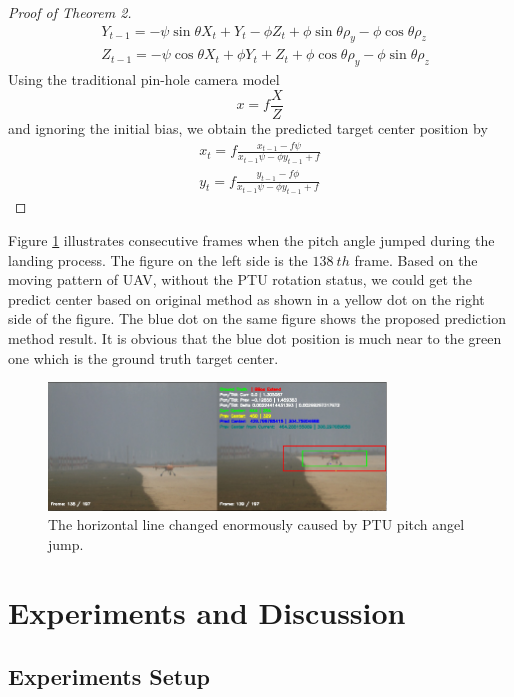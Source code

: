 \documentclass[journal,article,submit,moreauthors,pdftex,10pt,a4paper]{mdpi}
\begin{document}
\begin{proof}[Proof of Theorem 2]
\begin{align}
&Y_{t-1} = -\psi \sin \theta X_t +  Y_ t - \phi Z_t + \phi \sin \theta \rho_y - \phi \cos \theta \rho_z \\
&Z_{t-1}  = -\psi \cos \theta X_t + \phi  Y_ t + Z_t + \phi \cos \theta \rho_y - \phi \sin \theta \rho_z
\end{align}
Using the traditional pin-hole camera model
\begin{equation}
x = f \frac{X}{Z}
\end{equation}
and ignoring the initial bias, we obtain the predicted target center position by
\begin{align}
\label{eq:prev_predict_curr}
x_{t} = f\frac{x_{t-1} - f\psi }{x_{t-1}  \psi  - \phi y_{t-1} + f} \\
y_{t} = f\frac{y_{t-1} -f\phi}{  x_{t-1} \psi - \phi y_{t-1} + f}
\end{align}
\end{proof}

Figure \ref{fig:chp04_17_predict_1} illustrates consecutive frames when the pitch angle jumped during the landing process. The figure on the left side is the $138\ th$ frame. Based on the moving pattern of UAV, without the PTU rotation status, we could get the predict center based on original method as shown in a yellow dot on the right side of the figure. The blue dot on the same figure shows the proposed prediction method result. It is obvious that the blue dot position is much near to the green one which is the ground truth target center.

\begin{figure}[!th]
	\centering
	\includegraphics[width=0.8\textwidth]{Figs/chp04_17_predict_1.pdf}
	\caption{The horizontal line changed enormously caused by PTU pitch angel jump. }
	\label{fig:chp04_17_predict_1}    
\end{figure}


\section{Experiments and Discussion}
\subsection{Experiments Setup}
\end{document}

